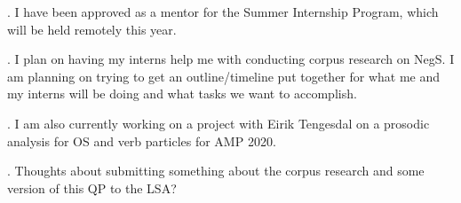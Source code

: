 \documentclass[12pt, letterpaper]{article}
\begin{document}
\ex. I have been approved as a mentor for the Summer Internship Program, which will be held remotely this year.

\ex. I plan on having my interns help me with conducting corpus research on NegS. I am planning on trying to get an outline/timeline put together for what me and my interns will be doing and what tasks we want to accomplish.

\ex. I am also currently working on a project with Eirik Tengesdal on a prosodic analysis for OS and verb particles for AMP 2020.

\ex. Thoughts about submitting something about the corpus research and some version of this QP to the LSA?



\printbibliography

\end{document}
